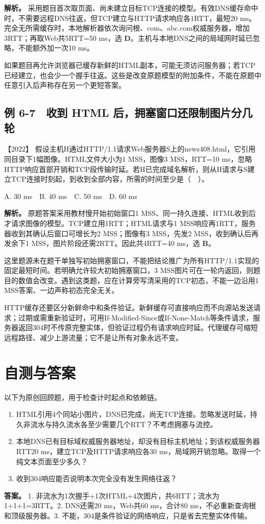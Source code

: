 \textbf{解析。} 采用题目首次取页面、尚未建立目标TCP连接的模型。有效DNS缓存命中时，不需要远程DNS往返，但TCP建立与HTTP请求响应各1RTT，最短20 ms。完全无所需缓存时，本地解析器依次询问根、com、abc.com权威服务器，增加3RTT；再取Web共5RTT=50 ms，选 \textbf{D}。主机与本地DNS之间的局域网时延已忽略，不能额外加一次10 ms。

如果题目再允许浏览器已缓存新鲜的HTML副本，可能无须访问服务器；若TCP已经建立，也会少一个握手往返。这些是改变原题模型的附加条件，不能在原题中任意引入后声称存在另一个更短答案。

\subsection{例 6-7　收到 HTML 后，拥塞窗口还限制图片分几轮}\label{cn-ex6-7}

\noindent{}【2022】 假设主机H通过HTTP/1.1请求Web服务器S上的news408.html，它引用同目录下1幅图像。HTML文件大小为1 MSS，图像3 MSS，RTT=10 ms，忽略HTTP响应首部开销和TCP段传输时延。若H已完成域名解析，则从H请求与S建立TCP连接时刻起，到收到全部内容，所需的时间至少是（　）。

A. 30 ms　B. 40 ms　C. 50 ms　D. 60 ms


\textbf{解析。} 原题答案采用教材慢开始初始窗口1 MSS、同一持久连接、HTML收到后才请求图像的模型。TCP建立用1RTT；HTML请求与1 MSS响应再1RTT，服务器收到其确认后窗口可增长为2 MSS；图像有3 MSS，先发2 MSS，收到确认后再发余下1 MSS，图片阶段还需2RTT。因此共4RTT=40 ms，选 \textbf{B}。

这里题源未在题干单独写初始拥塞窗口，不能把结论推广为所有HTTP/1.1实现的固定最短时间。若明确允许较大初始拥塞窗口，3 MSS图片可在一轮内返回，则题目的数值会改变。遇到这类题，应在计算旁写清采用的TCP初态，不能一边沿用1 MSS答案、一边声称初态完全无关。

HTTP缓存还要区分新鲜命中和条件验证。新鲜缓存可直接响应而不向源站发送请求；过期或需重新验证时，可用If-Modified-Since或If-None-Match等条件请求，服务器返回304时不传原完整实体，但验证过程仍有请求响应时延。代理缓存可缩短远程路径、减少上游流量；它不是让所有对象永远不变。

\section{自测与答案}\label{cn-ch6-review}

以下为原创回顾题，用于检查计时起点和依赖链。

\begin{enumerate}
\def\labelenumi{\arabic{enumi}.}
\tightlist
\item
  HTML引用4个同站小图片，DNS已完成，尚无TCP连接。忽略发送时延，持久非流水与持久流水各至少需要几个RTT？不考虑拥塞与流控。
\item
  本地DNS已有目标域权威服务器地址，却没有目标主机地址；到该权威服务器RTT20 ms，建立TCP及HTTP请求响应各30 ms，局域网开销忽略。取得一个纯文本页面至少多久？
\item
  收到304响应能否说明本次完全没有发生网络往返？
\end{enumerate}

\textbf{答案。} 1. 非流水为1次握手+1次HTML+4次图片，共6RTT；流水为1+1+1=3RTT。2. DNS还需20 ms，Web共60 ms，合计80 ms，不必重新查询根和顶级服务器。3. 不能，304是条件验证的网络响应，只是省去完整实体传输。
